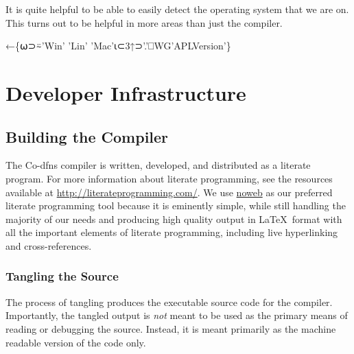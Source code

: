 \documentclass{article}%
\begin{document}
It is quite helpful to be able to easily detect the operating system
that we are on.
This turns out to be helpful in more areas than just the compiler.

\nwenddocs{}\endmoddef\nwstartdeflinemarkup{}\nwenddeflinemarkup
{}←\{⍵⊃⍨'Win' 'Lin' 'Mac'⍳⊂3↑⊃'.'⎕WG'APLVersion'\}
\eatline
{}\nwendcode{}\nwdocspar
\section{Developer Infrastructure}

\subsection{Building the Compiler}

The Co-dfns compiler is written, developed, and distributed as a
literate program.
For more information about literate programming,
see the resources available at \url{http://literateprogramming.com/}.
We use \href{https://www.cs.tufts.edu/~nr/noweb/}{noweb} as our
preferred literate programming tool because it is eminently simple,
while still handling the majority of our needs and producing high
quality output in \LaTeX\ format with all the important elements of
literate programming, including live hyperlinking and cross-references.

\subsubsection{Tangling the Source}

The process of tangling produces the executable source code 
for the compiler.
Importantly, the tangled output is \emph{not} meant to be used 
as the primary means of reading or debugging the source.
Instead, it is meant primarily as the machine readable version
of the code only.
\end{document}
